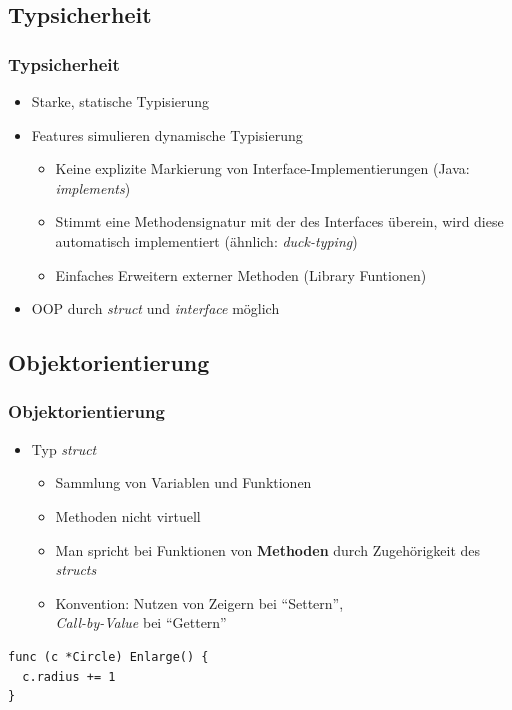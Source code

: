 \documentclass{beamer}
\begin{document}
\subsection{Typsicherheit}
\begin{frame}
\frametitle{Typsicherheit}

\begin{itemize}
\setlength{\itemsep}{24pt}
\item Starke, statische Typisierung
\item Features simulieren dynamische Typisierung
\begin{itemize}
\setlength{\itemsep}{12pt}
\item Keine explizite Markierung von Interface-Implementierungen (Java: \textit{implements})
\item Stimmt eine Methodensignatur mit der des Interfaces \"uberein, wird diese automatisch implementiert (\"ahnlich: \textit{duck-typing})
\item Einfaches Erweitern externer Methoden (Library Funtionen)
\end{itemize}
\item OOP durch \textit{struct} und \textit{interface} m\"oglich
\end{itemize}

\end{frame}

\subsection{Objektorientierung}
\begin{frame}[fragile]
\frametitle{Objektorientierung}

\begin{itemize}
\item Typ \textit{struct}
\begin{itemize}
\setlength{\itemsep}{12pt}
\item Sammlung von Variablen und Funktionen
\item Methoden nicht virtuell
\item Man spricht bei Funktionen von \textbf{Methoden} durch Zugeh\"origkeit des \textit{structs}
\item Konvention: Nutzen von Zeigern bei ``Settern'',\\ \textit{Call-by-Value} bei ``Gettern''
\end{itemize}
\end{itemize}

\begin{lstlisting}
func (c *Circle) Enlarge() {
  c.radius += 1
}
\end{lstlisting}

\end{frame}
\end{document}
